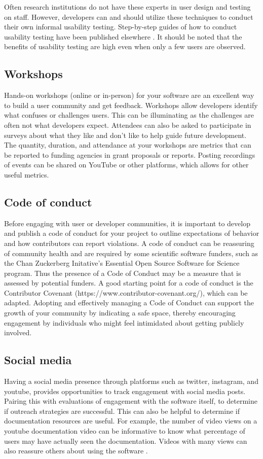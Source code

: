 \documentclass{article}
\begin{document}
Often research institutions do not have these experts in user design and testing on staff. However, developers can and should utilize these techniques to conduct their own informal usability testing. Step-by-step guides of how to conduct usability testing have been published elsewhere \cite{savonen_2021}.  It should be noted that the benefits of usability testing are high even when only a few users are observed. 

\subsection{Workshops}
Hands-on workshops (online\cite{dillon_experiences_2021} or in-person) for your software are an excellent way to build a user community and get feedback. Workshops allow developers identify what confuses or challenges users. This can be illuminating as the challenges are often not what developers expect. Attendees can also be asked to participate in surveys about what they like and don't like to help guide future development. The quantity, duration, and attendance at your workshops are metrics that can be reported to funding agencies in grant proposals or reports. Posting recordings of events can be shared on YouTube or other platforms, which allows for other useful metrics. 

\subsection{Code of conduct}
Before engaging with user or developer communities, it is important to develop and publish a code of conduct for your project to outline expectations of behavior and how contributors can report violations. A code of conduct can be reassuring of community health and are required by some scientific software funders, such as the Chan Zuckerberg Initative’s Essential Open Source Software for Science program. Thus the presence of a Code of Conduct may be a measure that is assessed by potential funders. A good starting point for a code of conduct is the Contributor Covenant (https://www.contributor-covenant.org/), which can be adapted. Adopting and effectively managing\cite{aurora_how_2019} a  Code of Conduct can support the growth of your community by indicating a safe space, thereby encouraging engagement by individuals who might feel intimidated about getting publicly involved.

\subsection{Social media}
Having a social media presence through platforms such as twitter, instagram, and youtube, provides opportunities to track engagement with social media posts.  Pairing this with evaluations of engagement with the software itself, to determine if outreach strategies are successful. This can also be helpful to determine if documentation resources are useful. For example, the number of video views on a youtube documentation video can be informative to know what percentage of users may have actually seen the documentation. Videos with many views can also reassure others about using the software . 
\end{document}
